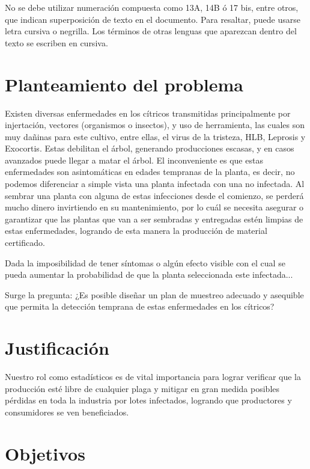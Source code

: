 No se debe utilizar numeraci\'{o}n compuesta como 13A, 14B \'{o} 17 bis, entre otros, que indican superposici\'{o}n de texto en el documento. Para resaltar, puede usarse letra cursiva o negrilla. Los t\'{e}rminos de otras lenguas que aparezcan dentro del texto se escriben en cursiva.\\

\section{Planteamiento del problema}
Existen diversas enfermedades en los c\'{i}tricos transmitidas principalmente por injertaci\'{o}n, vectores (organismos o insectos), y uso de herramienta, las cuales son muy da\~{n}inas para este cultivo, entre ellas, el virus de la tristeza, HLB, Leprosis y Exocortis. Estas debilitan el \'{a}rbol, generando producciones escasas, y en casos avanzados puede llegar a matar el \'{a}rbol. El inconveniente es que estas enfermedades son asintom\'{a}ticas en edades tempranas de la planta, es decir, no podemos diferenciar a simple vista una planta infectada con una no infectada. Al sembrar una planta con alguna de estas infecciones desde el comienzo, se perder\'{a} mucho dinero invirtiendo en su mantenimiento, por lo cu\'{a}l se necesita asegurar o garantizar que las plantas que van a ser sembradas y entregadas est\'{e}n limpias de estas enfermedades, logrando de esta manera la producci\'{o}n de material certificado.

Dada la imposibilidad de tener s\'{i}ntomas o alg\'{u}n efecto visible con el cual se pueda aumentar la probabilidad de que la planta seleccionada este infectada...

Surge la pregunta: ¿Es posible dise\~{n}ar un plan de muestreo adecuado y asequible que permita la detecci\'{o}n temprana de estas enfermedades en los c\'{i}tricos?

\section{Justificaci\'{o}n}
Nuestro rol como estad\'{i}sticos es de vital importancia para lograr verificar que la producci\'{o}n est\'{e} libre de cualquier plaga y mitigar en gran medida posibles p\'{e}rdidas en toda la industria por lotes infectados, logrando que productores y consumidores se ven beneficiados.

\section{Objetivos}
